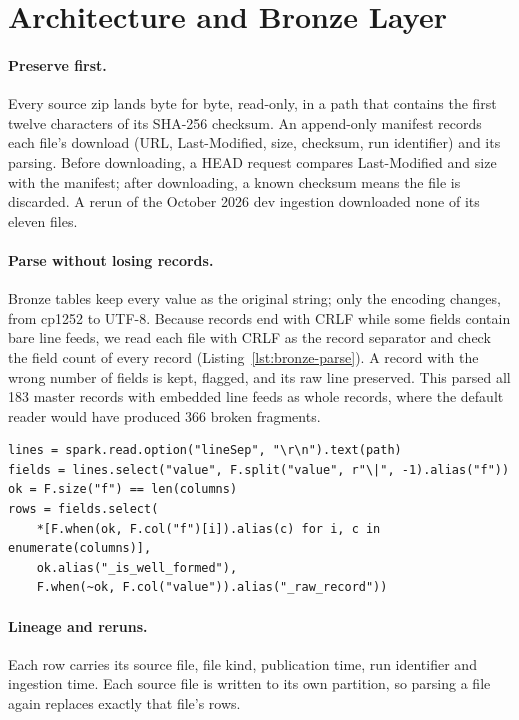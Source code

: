\section{Architecture and Bronze Layer}
\label{sec:bronze}


\paragraph{Preserve first.}
Every source zip lands byte for byte, read-only, in a path that contains the first twelve
characters of its SHA-256 checksum. An append-only manifest records each file's download
(URL, Last-Modified, size, checksum, run identifier) and its parsing. Before downloading, a HEAD
request compares Last-Modified and size with the manifest; after downloading, a known checksum
means the file is discarded. A rerun of the October 2026 dev ingestion downloaded none of its
eleven files.

\paragraph{Parse without losing records.}
Bronze tables keep every value as the original string; only the encoding changes, from cp1252
to UTF-8. Because records end with CRLF while some fields contain bare line feeds, we read each
file with CRLF as the record separator and check the field count of every record
(Listing~\ref{lst:bronze-parse}). A record with the wrong number of fields is kept, flagged, and
its raw line preserved. This parsed all 183 master records with embedded line feeds as whole
records, where the default reader would have produced 366 broken fragments.

\begin{lstlisting}[caption={Bronze parsing of one source file (simplified).},label={lst:bronze-parse}]
lines = spark.read.option("lineSep", "\r\n").text(path)
fields = lines.select("value", F.split("value", r"\|", -1).alias("f"))
ok = F.size("f") == len(columns)
rows = fields.select(
    *[F.when(ok, F.col("f")[i]).alias(c) for i, c in enumerate(columns)],
    ok.alias("_is_well_formed"),
    F.when(~ok, F.col("value")).alias("_raw_record"))
\end{lstlisting}

\paragraph{Lineage and reruns.}
Each row carries its source file, file kind, publication time, run identifier and ingestion
time. Each source file is written to its own partition, so parsing a file again replaces exactly
that file's rows.

